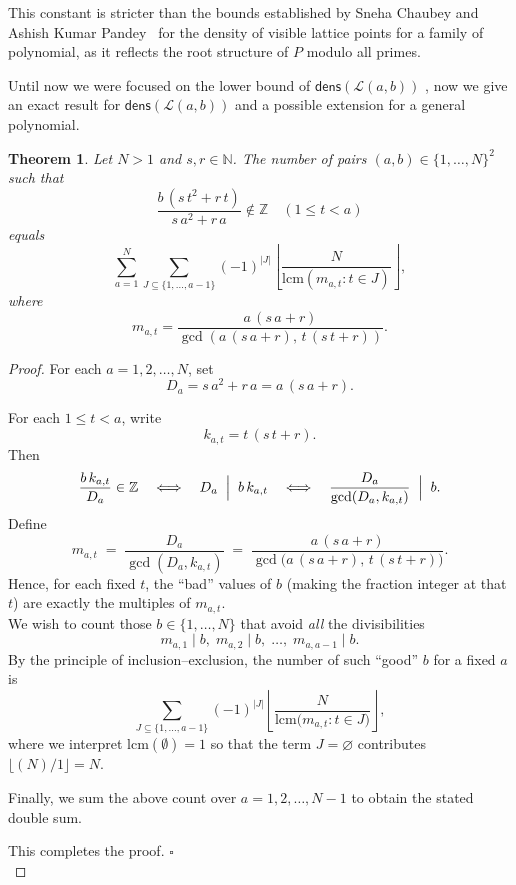 \documentclass[12pt, reqno]{amsart}
\newtheorem{theorem}{Theorem}[section]
\theoremstyle{definition}
\theoremstyle{remark}
\numberwithin{equation}{section}
\begin{document}
This constant is stricter than the bounds established by Sneha Chaubey and Ashish Kumar Pandey~\cite{Sneha} for the density of visible lattice points for a family of polynomial, as it reflects the root structure of \(P\) modulo all primes.


Until now we were focused on the lower bound of $\mathsf{dens}(\mathcal{L}(a,b))$ , now we give an exact result for  $\mathsf{dens}(\mathcal{L}(a,b))$ and a possible extension for a general polynomial.\\

\begin{theorem}
Let \(N>1\) and \(s,r\in\mathbb{N}\).  
The number of pairs \((a,b)\in\{1,\dots,N\}^2\) such that
\[
\frac{b\,(s\,t^2+r\,t)}{s\,a^2+r\,a}\notin\mathbb{Z}
\quad (1\le t<a)
\]
equals
\[
\sum_{a=1}^N
\sum_{J\subseteq\{1,\dots,a-1\}}
(-1)^{|J|}
\left\lfloor
\frac{N}{
\mathrm{lcm}(m_{a,t}:t\in J)
}
\right\rfloor,
\]
where
\[
m_{a,t}
=\frac{a\,(s\,a+r)}{
\gcd(a\,(s\,a+r),\,t\,(s\,t+r))
}.
\]
\end{theorem}

\begin{proof}
  For each \(a=1,2,\dots,N\), set
    \[
      D_a = s\,a^2 + r\,a = a\,(s\,a+r).
    \]
  
    For each \(1\le t<a\), write
    \[
      k_{a,t} = t\,(s\,t + r).
    \]
    Then
    \[
      \frac{b\,k_{a,t}}{D_a}\in\mathbb{Z}
      \quad\Longleftrightarrow\quad
      D_a\;\Bigm\vert\;b\,k_{a,t}
      \quad\Longleftrightarrow\quad
      \frac{D_a}{\gcd(D_a,k_{a,t})}\;\Bigm\vert\;b.
    \]
    Define
    \[
      m_{a,t} \;=\;\frac{D_a}{\gcd(D_a,k_{a,t})}
      \;=\;
      \frac{a\,(s\,a+r)}{\gcd\bigl(a\,(s\,a+r),\,t\,(s\,t+r)\bigr)}.
    \]
    Hence, for each fixed \(t\), the “bad” values of \(b\) (making the fraction integer at that \(t\)) are exactly the multiples of \(m_{a,t}\).\\

  
      We wish to count those \(b\in\{1,\dots,N\}\) that avoid \emph{all} the divisibilities
    \[
      m_{a,1}\mid b,\;
      m_{a,2}\mid b,\;
      \dots,\;
      m_{a,a-1}\mid b.
    \]
    By the principle of inclusion–exclusion, the number of such “good” \(b\) for a fixed \(a\) is
    \[
      \sum_{J\subseteq\{1,\dots,a-1\}}
      (-1)^{|J|}
      \left\lfloor
        \frac{N}
              {\mathrm{lcm}\bigl(m_{a,t}:t\in J\bigr)}
      \right\rfloor,
    \]
    where we interpret \(\mathrm{lcm}(\emptyset)=1\) so that the term \(J=\varnothing\) contributes \(\lfloor(N)/1\rfloor=N\).

  
      Finally, we sum the above count over \(a=1,2,\dots, N-1\) to obtain the stated double sum.

This completes the proof. $\square$ \\
\end{proof}
\end{document}
